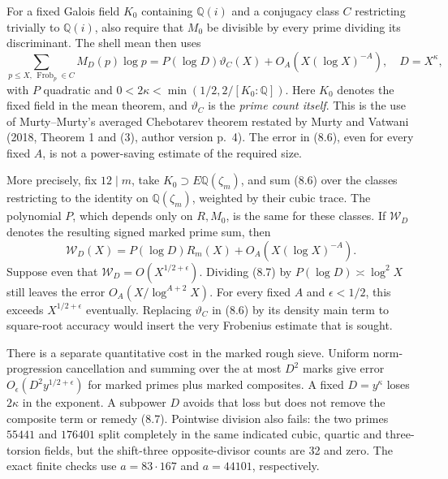 \documentclass[11pt]{article}
\newcommand{\Q}{\mathbb Q}
\newcommand{\Frob}{\operatorname{Frob}}
\begin{document}
For a fixed Galois field $K_0$ containing $\Q(i)$ and a conjugacy class $C$ restricting trivially to $\Q(i)$, also require that $M_0$ be divisible by every prime dividing its discriminant. The shell mean then uses
\[
 \sum_{p\le X,\,\Frob_p\in C}M_D(p)\log p
      =P(\log D)\vartheta_C(X)+O_A(X(\log X)^{-A}),
 \quad D=X^\kappa,
 \tag{8.6}
\]
with $P$ quadratic and $0<2\kappa<\min(1/2,2/[K_0:\Q])$. Here $K_0$ denotes the fixed field in the mean theorem, and $\vartheta_C$ is the \emph{prime count itself}. This is the use of Murty--Murty's averaged Chebotarev theorem restated by Murty and Vatwani (2018, Theorem 1 and (3), author version p.~4). The error in (8.6), even for every fixed $A$, is not a power-saving estimate of the required size.

More precisely, fix $12\mid m$, take $K_0\supset E\Q(\zeta_m)$, and sum (8.6) over the classes restricting to the identity on $\Q(\zeta_m)$, weighted by their cubic trace. The polynomial $P$, which depends only on $R,M_0$, is the same for these classes. If $\mathcal W_D$ denotes the resulting signed marked prime sum, then
\[
 \mathcal W_D(X)=P(\log D)R_m(X)+O_A(X(\log X)^{-A}).
 \tag{8.7}
\]
Suppose even that $\mathcal W_D=O(X^{1/2+\epsilon})$. Dividing (8.7) by $P(\log D)\asymp\log^2X$ still leaves the error $O_A(X/\log^{A+2}X)$. For every fixed $A$ and $\epsilon<1/2$, this exceeds $X^{1/2+\epsilon}$ eventually. Replacing $\vartheta_C$ in (8.6) by its density main term to square-root accuracy would insert the very Frobenius estimate that is sought.

There is a separate quantitative cost in the marked rough sieve. Uniform norm-progression cancellation and summing over the at most $D^2$ marks give error $O_\epsilon(D^2y^{1/2+\epsilon})$ for marked primes plus marked composites. A fixed $D=y^\kappa$ loses $2\kappa$ in the exponent. A subpower $D$ avoids that loss but does not remove the composite term or remedy (8.7). Pointwise division also fails: the two primes $55441$ and $176401$ split completely in the same indicated cubic, quartic and three-torsion fields, but the shift-three opposite-divisor counts are 32 and zero. The exact finite checks use $a=83\cdot167$ and $a=44101$, respectively.
\end{document}
